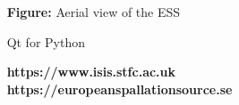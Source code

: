 \documentclass[usenames,dvipsnames]{beamer}
\begin{document}
\begin{frame}[t]
\begin{columns}[t]
\begin{column}{0.32\paperwidth}
\end{column}
\begin{column}{0.32\paperwidth}
\vspace{-10pt}

\begin{tcolorbox}[enhanced,width=\linewidth,height=12.5cm,arc=5mm,
       interior style={fill overzoom image*={}{aerialviewcropped.jpg}}]
\end{tcolorbox}
\vspace{-40pt}
\begin{center}
\color{white}\large\textbf{Figure:  }{Aerial view of the ESS}
\end{center}

\begin{custombox}{Qt for Python}

\end{custombox}

\begin{tcolorbox}[enhanced,width=\linewidth,height=18cm,arc=5mm,
       interior style={fill overzoom image*={}{beamon.png}}]
\end{tcolorbox}

\vspace{-1.5cm}
\begin{center}
\color{white}\LARGE\textbf{https://www.isis.stfc.ac.uk\\https://europeanspallationsource.se}
\end{center}
\end{column}
\end{columns}
\end{frame}
\end{document}
